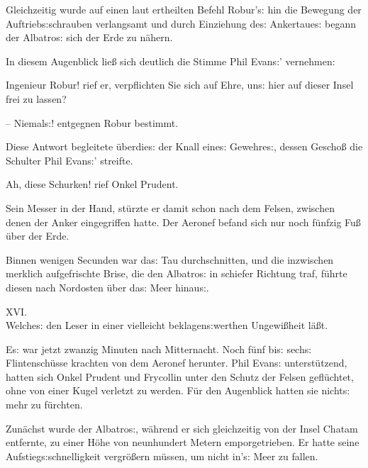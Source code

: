 \documentclass[oneside,12pt]{book}
\newenvironment{antiqua}{\normalfont}{}
\newcommand{\s}{s:}
\begin{document}
Gleichzeitig wurde auf einen laut ertheilten Befehl Robur'{\s} hin
die Bewegung der Auftrieb{\s}\-schrauben verlangsamt und durch
Einziehung de{\s} Ankertaue{\s} begann der {\glqq}Albatro{\s}{\grqq}
sich der Erde zu n\"ahern.

In diesem Augenblick lie{\ss} sich deutlich die Stimme Phil Evan{\s}'
vernehmen:

{\glqq}Ingenieur Robur! rief er, verpflichten Sie sich auf Ehre,
un{\s} hier auf dieser Insel frei zu lassen?

-- Niemal{\s}!{\grqq} entgegnen Robur bestimmt.

Diese Antwort begleitete \"uberdie{\s} der Knall eine{\s}
Gewehre{\s}, dessen Gescho{\ss} die Schulter Phil Evan{\s}' streifte.

{\glqq}Ah, diese Schurken!{\grqq} rief Onkel Prudent.

Sein Messer in der Hand, st\"urzte er damit schon nach dem Felsen,
zwischen denen der Anker eingegriffen hatte. Der Aeronef befand sich
nur noch f\"unfzig Fu{\ss} \"uber der Erde.

Binnen wenigen Secunden war da{\s} Tau durchschnitten, und die
inzwischen merklich aufgefrischte Brise, die den
{\glqq}Albatro{\s}{\grqq} in schiefer Richtung traf, f\"uhrte diesen
nach Nordosten \"uber da{\s} Meer hinau{\s}.



\newpage\begin{center}\label{kap16}
{\large \begin{antiqua}XVI.\end{antiqua}\\
Welche{\s} den Leser in einer vielleicht beklagen{\s}werthen
Ungewi{\ss}heit l\"a{\ss}t.\\\bigskip}
\end{center}



E{\s} war jetzt zwanzig Minuten nach Mitternacht. Noch f\"unf bi{\s}
sech{\s} Flintensch\"usse krachten von dem Aeronef herunter. Phil
Evan{\s} unterst\"utzend, hatten sich Onkel Prudent und Frycollin
unter den Schutz der Felsen gefl\"uchtet, ohne von einer Kugel
verletzt zu werden. F\"ur den Augenblick hatten sie nicht{\s} mehr zu
f\"urchten.

Zun\"achst wurde der {\glqq}Albatro{\s}{\grqq}, w\"ahrend er sich
gleichzeitig von der Insel Chatam entfernte, zu einer H\"ohe von
neunhundert Metern emporgetrieben. Er hatte seine
Aufstieg{\s}schnelligkeit vergr\"o{\ss}ern m\"ussen, um nicht in'{\s}
Meer zu fallen.
\end{document}
